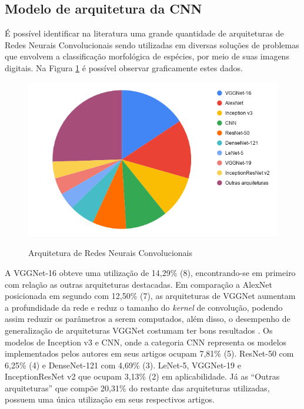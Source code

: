 \documentclass[
	12pt,				%
	oneside,			%
	a4paper,			%
	english,			%
	brazil				%
	]{abntex2ppgsi}
\begin{document}
\subsection{Modelo de arquitetura da CNN}
É possível identificar na literatura uma grande quantidade de arquiteturas de Redes Neurais Convolucionais sendo utilizadas em diversas soluções de problemas que envolvem a classificação morfológica de espécies, por meio de suas imagens digitais. Na Figura \ref{fig:grafico_arquitetura_vs_uso} é possível observar graficamente estes dados.

\begin{figure}[H]
    \centering
    \caption{Arquitetura de Redes Neurais Convolucionais}
    \includegraphics[scale=.60]{imagens/revisao_sistematica/grafico_arquitetura_vs_uso.png}
    \label{fig:grafico_arquitetura_vs_uso}
\end{figure}

A VGGNet-16 obteve uma utilização de 14,29\% (8), encontrando-se em primeiro com relação as outras arquiteturas destacadas. Em comparação a AlexNet posicionada em segundo com 12,50\% (7), as arquiteturas de VGGNet aumentam a profundidade da rede e reduz o tamanho do \textit{kernel} de convolução, podendo assim reduzir os parâmetros a serem computados, além disso, o desempenho de generalização de arquiteturas VGGNet costumam ter bons resultados \cite{li2020using}. Os modelos de Inception v3 e CNN, onde a categoria CNN representa os modelos implementados pelos autores em seus artigos ocupam 7,81\% (5). ResNet-50 com 6,25\% (4) e DenseNet-121 com 4,69\% (3). LeNet-5, VGGNet-19 e InceptionResNet v2 que ocupam 3,13\% (2) em aplicabilidade. Já as ``Outras arquiteturas'' que compõe 20,31\% do restante das arquiteturas utilizadas, possuem uma única utilização em seus respectivos artigos.
\end{document}
